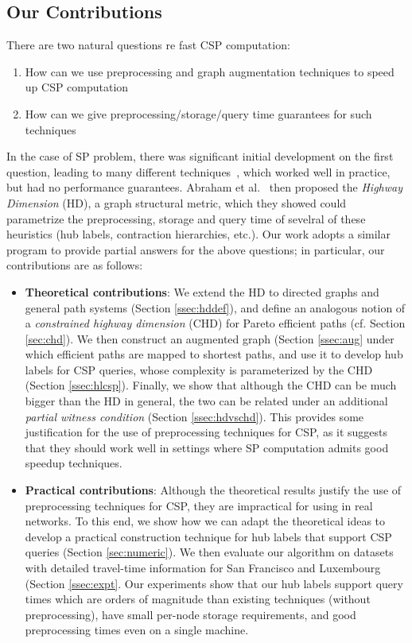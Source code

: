 \subsection{Our Contributions}

\noindent There are two natural questions re fast CSP computation:
\begin{enumerate}[nosep,leftmargin=*]
\item How can we use preprocessing and graph augmentation techniques to speed up CSP computation 
\item How can we give preprocessing/storage/query time guarantees for such techniques
\end{enumerate}

In the case of SP problem, there was significant initial development on the first question, leading to many different techniques~\cite{dimacs09}, which worked well in practice, but had no performance guarantees.
Abraham et al.~\cite{highway2010,highway2013} then proposed the \emph{Highway Dimension} (HD), a graph structural metric, which they showed could parametrize the preprocessing, storage and query time of sevelral of these heuristics (hub labels, contraction hierarchies, etc.).
Our work adopts a similar program to provide partial answers for the above questions; in particular, our contributions are as follows:
\begin{itemize}[nosep,leftmargin=*]
\item \textbf{Theoretical contributions}: 
We extend the HD to directed graphs and general path systems (Section \ref{ssec:hddef}), and define an analogous notion of a \emph{constrained highway dimension} (CHD) for Pareto efficient paths (cf. Section \ref{sec:chd}). We then construct an augmented graph (Section \ref{ssec:aug} under which efficient paths are mapped to shortest paths, and use it to develop hub labels for CSP queries, whose complexity is parameterized by the CHD (Section \ref{ssec:hlcsp}).
Finally, we show that although the CHD can be much bigger than the HD in general, the two can be related under an additional \emph{partial witness condition} (Section \ref{ssec:hdvschd}). This provides some justification for the use of preprocessing techniques for CSP, as it suggests that they should work well in settings where SP computation admits good speedup techniques.
\item \textbf{Practical contributions}: Although the theoretical results justify the use of preprocessing techniques for CSP, they are impractical for using in real networks. To this end, we show how we can adapt the theoretical ideas to develop a practical construction technique for hub labels that support CSP queries (Section \ref{sec:numeric}). We then evaluate our algorithm on datasets with detailed travel-time information for San Francisco and Luxembourg (Section \ref{ssec:expt}. Our experiments show that our hub labels support query times which are orders of magnitude than existing techniques (without preprocessing), have small per-node storage requirements, and good preprocessing times even on a single machine. 
\end{itemize}	

